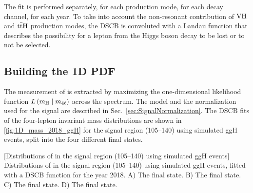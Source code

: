 The fit is performed separately, for each production mode, for each decay channel, for each year. 
To take into account the non-resonant contribution of $\mathrm{V}\mathrm{H}$ and $\mathrm{t} \bar{\mathrm{t}} \mathrm{H}$ production modes,
the DSCB is convoluted with a Landau function that describes the possibility for a lepton from the Higgs boson decay to be lost or to not be selected.

\subsection{Building the 1D PDF}
The measurement of \mH is extracted by maximizing the one-dimensional likelihood function $L \left( m_{\mathrm{H}} \; \middle| \;{} m_{4\ell} \right)$ across the \mfourl spectrum.
The model and the normalization used for the signal are described in Sec.~\ref{sec:SignalNormalization}.
The DSCB fits of the four-lepton invariant mass distributions are shown in \cref{fig:1D_mass_2018_ggH} for the signal region (105--140\GeV) using simulated ggH events, split into the four different final states.
\begin{multiFigure}
    \centering
        [Distributions of \mfourl in the signal region (105--140\GeV) using simulated ggH events]
        {Distributions of \mfourl in the signal region (105--140\GeV) using simulated ggH events, fitted with a DSCB function for the year 2018.
        \;A) The \fourmu final state.
        \;B) The \foure final state.
        \;C) The \twoetwomu final state.
        \;D) The \twomutwoe final state.}
    \label{fig:1D_mass_2018_ggH}
\end{multiFigure}

